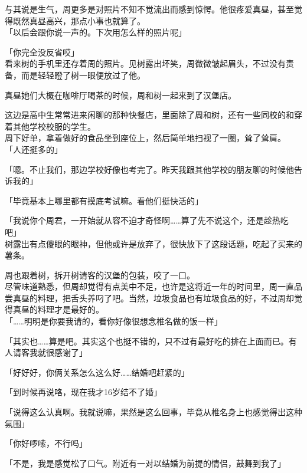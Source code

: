 与其说是生气，周更多是对照片不知不觉流出而感到惊愕。他很疼爱真昼，甚至觉得既然真昼高兴，那点小事也就算了。\\

「以后会跟你说一声的。下次用怎么样的照片呢」

「你完全没反省哎」\\

看来树的手机里还存着周的照片。见树露出坏笑，周微微皱起眉头，不过没有责备，而是轻轻瞪了树一眼便放过了他。\\

\vspace{2\baselineskip}

真昼她们大概在咖啡厅喝茶的时候，周和树一起来到了汉堡店。

这边是高中生常常进来闲聊的那种快餐店，里面除了周和树，还有一些同校的和穿着其他学校校服的学生。\\

周下好单，拿着做好的食品坐到座位上，然后简单地扫视了一圈，耸了耸肩。\\

「人还挺多的」

「嗯。不止我们，那边学校好像也考完了。昨天我跟其他学校的朋友聊的时候他告诉我的」

「毕竟基本上哪里都有摸底考试嘛。看他们挺快活的」

「我说你个周君，一开始就从容不迫才奇怪啊……算了先不说这个，还是趁热吃吧」\\

树露出有点傻眼的眼神，但他或许是放弃了，很快放下了这段话题，吃起了买来的薯条。

周也跟着树，拆开树请客的汉堡的包装，咬了一口。\\

尽管味道熟悉，但周却觉得有点美中不足，也许是这将近一年的时间里，周一直品尝真昼的料理，把舌头养叼了吧。当然，垃圾食品也有垃圾食品的好，不过周却觉得真昼的料理才是最好的。\\

「……明明是你要我请的，看你好像很想念椎名做的饭一样」

「其实也……算是吧。其实这个也挺不错的，只不过有最好吃的排在上面而已。有人请客我就很感谢了」

「好好好，你俩关系怎么这么好……结婚吧赶紧的」

「到时候再说咯，现在我才16岁结不了婚」

「说得这么认真啊。我就说嘛，果然是这么回事，毕竟从椎名身上也感觉得出这种氛围」

「你好啰嗦，不行吗」

「不是，我是感觉松了口气。附近有一对以结婚为前提的情侣，鼓舞到我了」\\

